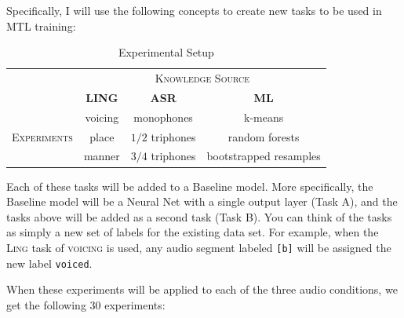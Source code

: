 \documentclass[10pt,a4paper]{article}
\begin{document}
Specifically, I will use the following concepts to create new tasks to be used in MTL training:

\begin{table}[!htbp]
  \centering
  \begin{adjustbox}{width=.55\textwidth}
    \begin{tabular}{cccc}
      \toprule
      & \multicolumn{3}{c}{\textsc{Knowledge Source}}\\
      & \textbf{LING} & \textbf{ASR} & \textbf{ML}\\
      \midrule
      \multirow{3}{*}{\textsc{Experiments}} & voicing & monophones &  k-means \\
      & place & $1/2$ triphones & random forests  \\
      & manner & $3/4$ triphones &  bootstrapped resamples  \\
      \bottomrule
    \end{tabular}
    \label{table:data}
  \end{adjustbox}
  
  \caption{Experimental Setup}
  
\end{table}


Each of these tasks will be added to a Baseline model. More specifically, the Baseline model will be a Neural Net with a single output layer (Task A), and the tasks above will be added as a second task (Task B). You can think of the tasks as simply a new set of labels for the existing data set. For example, when the \textsc{Ling} task of \textsc{voicing} is used, any audio segment labeled \texttt{[b]} will be assigned the new label \texttt{voiced}.

When these experiments will be applied to each of the three audio conditions, we get the following 30 experiments:
\end{document}
